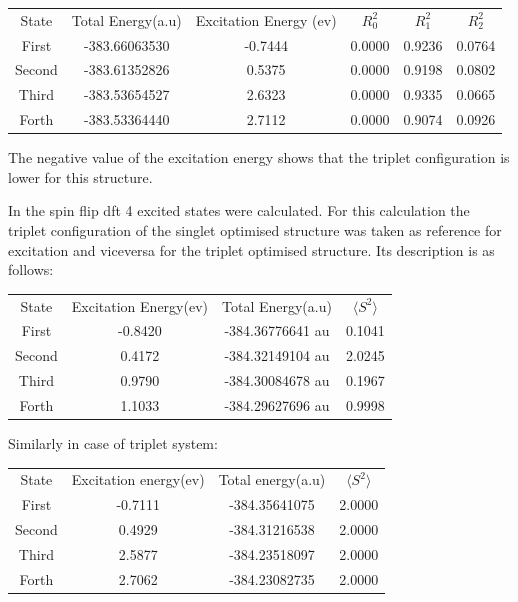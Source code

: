 \documentclass{article}
\begin{document}
 \label{tab:title} 
\begin{tabular}{c c c c c c }
State & Total Energy(a.u) & Excitation Energy (ev) & \(R_{0}^{2}\) & \(R_{1}^{2}\) & \(R_{2}^{2}\)\\
First & -383.66063530&   -0.7444 & 0.0000 & 0.9236 & 0.0764 \\
Second& -383.61352826&   0.5375 & 0.0000 & 0.9198 & 0.0802 \\
Third & -383.53654527&   2.6323 & 0.0000 & 0.9335 & 0.0665 \\
Forth & -383.53364440&   2.7112 & 0.0000 & 0.9074 & 0.0926 \\
\end{tabular}
The negative value of the excitation energy shows that the triplet configuration is lower for this structure.

In the spin flip dft 4 excited states were calculated. For this calculation the triplet configuration of the singlet optimised structure was taken as reference for excitation and viceversa for the triplet optimised structure. Its description is as follows:


 \label{tab:title} 
\begin{tabular}{c c c c}
State  & Excitation Energy(ev) & Total Energy(a.u) & \(\langle S^{2}\rangle \)\\
First  &  -0.8420           & -384.36776641 au      & 0.1041\\
Second &   0.4172           & -384.32149104 au      & 2.0245\\
Third  &   0.9790           & -384.30084678 au      & 0.1967\\
Forth  &   1.1033           & -384.29627696 au      & 0.9998\\
\end{tabular}


Similarly in case of triplet system:


 \label{tab:title} 
\begin{tabular}{c c c c}
State & Excitation energy(ev) & Total energy(a.u) & \(\langle S^{2} \rangle \)\\
First & -0.7111 & -384.35641075 & 2.0000\\
Second & 0.4929 & -384.31216538 &  2.0000\\
Third & 2.5877 & -384.23518097 & 2.0000\\
Forth & 2.7062 & -384.23082735 & 2.0000\\
\end{tabular}
\end{document}
